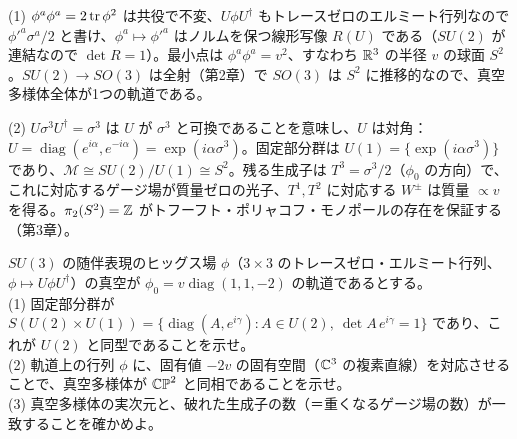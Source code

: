 \begin{solution}
(1) $\phi^a\phi^a=2\tr\phi^2$ は共役で不変、$U\phi U^\dagger$ もトレースゼロのエルミート行列なので $\phi'^a\sigma^a/2$ と書け、$\phi^a\mapsto\phi'^a$ はノルムを保つ線形写像 $R(U)$ である（$SU(2)$ が連結なので $\det R=1$）。最小点は $\phi^a\phi^a=v^2$、すなわち $\mathbb{R}^3$ の半径 $v$ の球面 $S^2$。$SU(2)\to SO(3)$ は全射（第2章）で $SO(3)$ は $S^2$ に推移的なので、真空多様体全体が1つの軌道である。

(2) $U\sigma^3U^\dagger=\sigma^3$ は $U$ が $\sigma^3$ と可換であることを意味し、$U$ は対角：$U=\operatorname{diag}(e^{i\alpha},e^{-i\alpha})=\exp(i\alpha\sigma^3)$。固定部分群は $U(1)=\{\exp(i\alpha\sigma^3)\}$ であり、$\mathcal M\cong SU(2)/U(1)\cong S^2$。残る生成子は $T^3=\sigma^3/2$（$\phi_0$ の方向）で、これに対応するゲージ場が質量ゼロの光子、$T^1,T^2$ に対応する $W^\pm$ は質量 $\propto v$ を得る。$\pi_2(S^2)=\mathbb{Z}$ がトフーフト・ポリャコフ・モノポールの存在を保証する（第3章）。
\end{solution}

\begin{problem}[難易度 C]\label{ch01-prob-cp2}
$SU(3)$ の随伴表現のヒッグス場 $\phi$（$3\times3$ のトレースゼロ・エルミート行列、$\phi\mapsto U\phi U^\dagger$）の真空が $\phi_0=v\operatorname{diag}(1,1,-2)$ の軌道であるとする。\\
(1) 固定部分群が $S(U(2)\times U(1))=\{\operatorname{diag}(A,e^{i\gamma}):A\in U(2),\ \det A\,e^{i\gamma}=1\}$ であり、これが $U(2)$ と同型であることを示せ。\\
(2) 軌道上の行列 $\phi$ に、固有値 $-2v$ の固有空間（$\mathbb{C}^3$ の複素直線）を対応させることで、真空多様体が $\mathbb{CP}^2$ と同相であることを示せ。\\
(3) 真空多様体の実次元と、破れた生成子の数（＝重くなるゲージ場の数）が一致することを確かめよ。
\end{problem}

